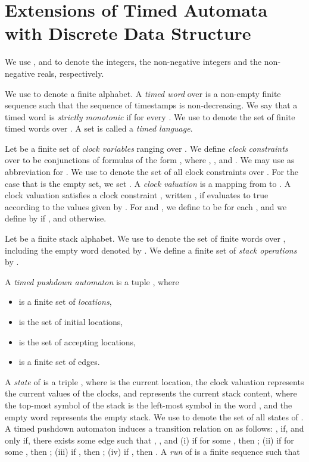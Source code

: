 \documentclass{CSML}
\theoremstyle{plain}\newtheorem{theorem}[thm]{Theorem}
\theoremstyle{plain}\newtheorem{corollary}[thm]{Corollary}
\theoremstyle{plain}\newtheorem{example}[thm]{Example}
\theoremstyle{plain}\newtheorem{lemma}[thm]{Lemma}
\theoremstyle{plain}\newtheorem{remark}[thm]{Remark}
\begin{document}
\section{Extensions of Timed Automata with Discrete Data Structure}
We use ,  and   to denote the integers, the non-negative integers and  the non-negative reals, respectively.



We use  to denote a finite alphabet. A {\em timed word} over  is a non-empty finite sequence  such that the sequence  of timestamps is non-decreasing.
We say that a timed word is \emph{strictly monotonic} if  for every . 
We use  to denote the set of finite timed words over .
A set  is called a {\em timed language}.


 
Let  be a finite set of {\em clock variables} ranging over .
We define {\em  clock constraints}  over  to be conjunctions of formulas of the form , where , , and . 
We may use  as abbreviation for . 
We use  to denote the set of all clock constraints over .
For the case that  is the empty set, we set . 
A \emph{clock valuation} is a mapping from  to . 
A clock valuation  satisfies a clock constraint , written , if  evaluates to true according to the values given by .
For  and , we define  to be  for each , and we define  by  if , and  otherwise. 


Let  be 
a finite stack alphabet. We use  to denote the set of finite words over , including the empty word denoted by . 
We define a finite set  of \emph{stack operations} by . 




A \emph{timed pushdown automaton} is a tuple
, where
\begin{itemize}
\item  is a finite set of \emph{locations},
\item  is the set of initial locations,
\item  is the set of accepting locations,
\item  is a finite set of edges. 
\end{itemize}	
A \emph{state} of  is a triple , where  is the current location, the clock valuation  represents the current values of the clocks, and  represents the current stack content, where the top-most symbol of the stack is the left-most 
symbol in the word , and the empty word  represents the empty stack. 
We use  to denote the set of all states of .
A timed pushdown automaton  induces a  transition relation  on  as follows:
, if, and only if, there exists some edge  
such that 
,
, 
and
(i) if  for some , 
then ;
(ii) if  for some ,
then  ;
(iii) if , then ;
(iv) if , then . 
A \emph{run} of  is a finite sequence 
 such that
 
\end{document}
